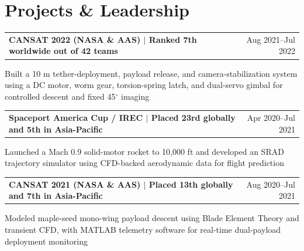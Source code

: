 \documentclass[10pt,a4paper]{article}
\makeatletter
\newcommand{\resumeProjectHeading}[2]{%
  \begin{tabular*}{\textwidth}{@{\extracolsep{\fill}}l r}
    \textbf{#1} & #2
  \end{tabular*}\vspace{-2.0pt}
}
\makeatother
\begin{document}
\section{Projects \& Leadership}
\resumeProjectHeading{CANSAT 2022 (NASA \& AAS) $\mid$ Ranked 7th worldwide out of 42 teams}{Aug 2021--Jul 2022}
{\hspace{6pt}Built a 10 m tether-deployment, payload release, and camera-stabilization system using a DC motor, worm gear, torsion-spring latch, and dual-servo gimbal for controlled descent and fixed 45$^{\circ}$ imaging}\vspace{-0.8pt}

\resumeProjectHeading{Spaceport America Cup / IREC $\mid$ Placed 23rd globally and 5th in Asia-Pacific}{Apr 2020--Jul 2021}
{\hspace{6pt}Launched a Mach 0.9 solid-motor rocket to 10,000 ft and developed an SRAD trajectory simulator using CFD-backed aerodynamic data for flight prediction}\vspace{-0.8pt}

\resumeProjectHeading{CANSAT 2021 (NASA \& AAS) $\mid$ Placed 13th globally and 7th in Asia-Pacific}{Aug 2020--Jul 2021}
{\hspace{6pt}Modeled maple-seed mono-wing payload descent using Blade Element Theory and transient CFD, with MATLAB telemetry software for real-time dual-payload deployment monitoring}
\end{document}
